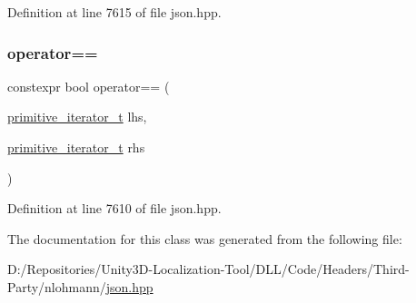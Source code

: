 Definition at line 7615 of file json.\+hpp.

\mbox{\label{classnlohmann_1_1detail_1_1primitive__iterator__t_aae1e1e2ec0e229d1291d69de57d76bbe}} 
\subsubsection{\texorpdfstring{operator==}{operator==}}
{\footnotesize\ttfamily constexpr bool operator== (\begin{DoxyParamCaption}\item[{\mbox{\hyperlink{classnlohmann_1_1detail_1_1primitive__iterator__t}{primitive\+\_\+iterator\+\_\+t}}}]{lhs,  }\item[{\mbox{\hyperlink{classnlohmann_1_1detail_1_1primitive__iterator__t}{primitive\+\_\+iterator\+\_\+t}}}]{rhs }\end{DoxyParamCaption})\hspace{0.3cm}{\ttfamily [friend]}}



Definition at line 7610 of file json.\+hpp.



The documentation for this class was generated from the following file\+:\begin{DoxyCompactItemize}
\item 
D\+:/\+Repositories/\+Unity3\+D-\/\+Localization-\/\+Tool/\+D\+L\+L/\+Code/\+Headers/\+Third-\/\+Party/nlohmann/\mbox{\hyperlink{json_8hpp}{json.\+hpp}}\end{DoxyCompactItemize}
